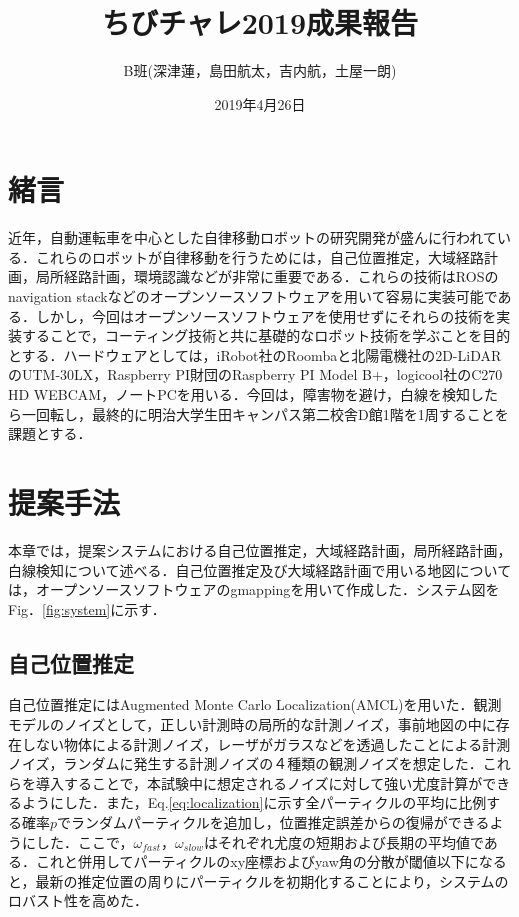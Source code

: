 \documentclass{jarticle}
\begin{document}
\title{ちびチャレ2019成果報告}
\author{B班(深津蓮，島田航太，吉内航，土屋一朗)}
\date{2019年4月26日}
\maketitle

\section{緒言}
近年，自動運転車を中心とした自律移動ロボットの研究開発が盛んに行われている．これらのロボットが自律移動を行うためには，自己位置推定，大域経路計画，局所経路計画，環境認識などが非常に重要である．これらの技術はROSのnavigation stack\cite{ns}などのオープンソースソフトウェアを用いて容易に実装可能である．しかし，今回はオープンソースソフトウェアを使用せずにそれらの技術を実装することで，コーティング技術と共に基礎的なロボット技術を学ぶことを目的とする．ハードウェアとしては，iRobot社のRoomba\cite{roomba}と北陽電機社の2D-LiDARのUTM-30LX\cite{lrf}，Raspberry PI財団のRaspberry PI Model B+\cite{raspi}，logicool社のC270 HD WEBCAM\cite{webcam}，ノートPCを用いる．今回は，障害物を避け，白線を検知したら一回転し，最終的に明治大学生田キャンパス第二校舎D館1階を1周することを課題とする．

\section{提案手法}
本章では，提案システムにおける自己位置推定，大域経路計画，局所経路計画，白線検知について述べる．自己位置推定及び大域経路計画で用いる地図については，オープンソースソフトウェアのgmapping\cite{gmapping}を用いて作成した．システム図をFig．\ref{fig:system}に示す．

\subsection{自己位置推定}
自己位置推定にはAugmented Monte Carlo Localization(AMCL)\cite{localization}を用いた．観測モデルのノイズとして，正しい計測時の局所的な計測ノイズ，事前地図の中に存在しない物体による計測ノイズ，レーザがガラスなどを透過したことによる計測ノイズ，ランダムに発生する計測ノイズの４種類の観測ノイズを想定した．これらを導入することで，本試験中に想定されるノイズに対して強い尤度計算ができるようにした．また，Eq.\ref{eq:localization}に示す全パーティクルの平均に比例する確率$p$でランダムパーティクルを追加し，位置推定誤差からの復帰ができるようにした．ここで，$\omega_{fast}$，$\omega_{slow}$はそれぞれ尤度の短期および長期の平均値である．これと併用してパーティクルのxy座標およびyaw角の分散が閾値以下になると，最新の推定位置の周りにパーティクルを初期化することにより，システムのロバスト性を高めた．
\end{document}
